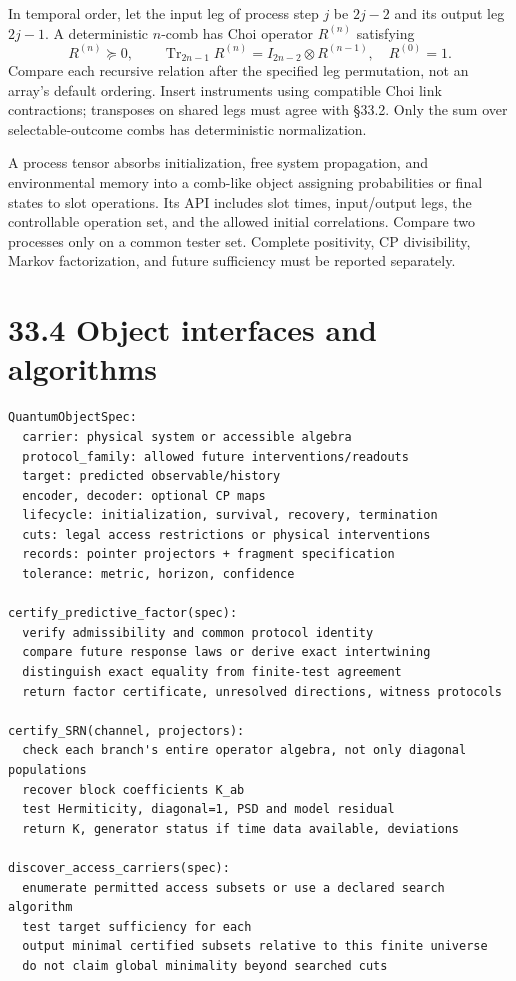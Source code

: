 \documentclass[
  11pt,
  oneside]{book}
\begin{document}
In temporal order, let the input leg of process step \(j\) be \(2j-2\)
and its output leg \(2j-1\). A deterministic \(n\)-comb has Choi
operator \(R^{(n)}\) satisfying \[
R^{(n)}\succeq0,\qquad
\operatorname{Tr}_{2n-1}R^{(n)}
=I_{2n-2}\otimes R^{(n-1)},\quad R^{(0)}=1.
\] Compare each recursive relation after the specified leg permutation,
not an array's default ordering. Insert instruments using compatible
Choi link contractions; transposes on shared legs must agree with §33.2.
Only the sum over selectable-outcome combs has deterministic
normalization.

A process tensor absorbs initialization, free system propagation, and
environmental memory into a comb-like object assigning probabilities or
final states to slot operations. Its API includes slot times,
input/output legs, the controllable operation set, and the allowed
initial correlations. Compare two processes only on a common tester set.
Complete positivity, CP divisibility, Markov factorization, and future
sufficiency must be reported separately.

\section{33.4 Object interfaces and algorithms}

\begin{Verbatim}[breaklines,breakanywhere,fontsize=\scriptsize]
QuantumObjectSpec:
  carrier: physical system or accessible algebra
  protocol_family: allowed future interventions/readouts
  target: predicted observable/history
  encoder, decoder: optional CP maps
  lifecycle: initialization, survival, recovery, termination
  cuts: legal access restrictions or physical interventions
  records: pointer projectors + fragment specification
  tolerance: metric, horizon, confidence

certify_predictive_factor(spec):
  verify admissibility and common protocol identity
  compare future response laws or derive exact intertwining
  distinguish exact equality from finite-test agreement
  return factor certificate, unresolved directions, witness protocols

certify_SRN(channel, projectors):
  check each branch's entire operator algebra, not only diagonal populations
  recover block coefficients K_ab
  test Hermiticity, diagonal=1, PSD and model residual
  return K, generator status if time data available, deviations

discover_access_carriers(spec):
  enumerate permitted access subsets or use a declared search algorithm
  test target sufficiency for each
  output minimal certified subsets relative to this finite universe
  do not claim global minimality beyond searched cuts
\end{Verbatim}
\end{document}

